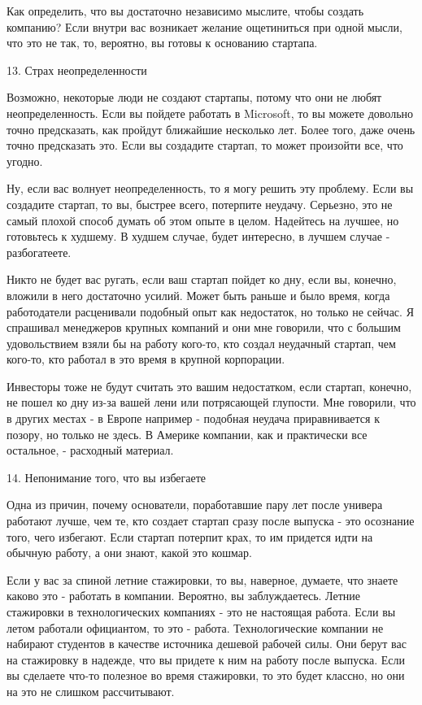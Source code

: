 \documentclass[ebook,12pt,oneside,openany]{memoir}
\begin{document}
Как определить, что вы достаточно независимо мыслите, чтобы создать
компанию? Если внутри вас возникает желание ощетиниться при одной
мысли, что это не так, то, вероятно, вы готовы к основанию стартапа.

13. Страх неопределенности

Возможно, некоторые люди не создают стартапы, потому что они не любят
неопределенность. Если вы пойдете работать в Microsoft, то вы можете
довольно точно предсказать, как пройдут ближайшие несколько лет. Более
того, даже очень точно предсказать это. Если вы создадите стартап, то
может произойти все, что угодно.

Ну, если вас волнует неопределенность, то я могу решить эту проблему.
Если вы создадите стартап, то вы, быстрее всего, потерпите неудачу.
Серьезно, это не самый плохой способ думать об этом опыте в целом.
Надейтесь на лучшее, но готовьтесь к худшему. В худшем случае, будет
интересно, в лучшем случае - разбогатеете.

Никто не будет вас ругать, если ваш стартап пойдет ко дну, если вы,
конечно, вложили в него достаточно усилий. Может быть раньше и было
время, когда работодатели расценивали подобный опыт как недостаток, но
только не сейчас. Я спрашивал менеджеров крупных компаний и они мне
говорили, что с большим удовольствием взяли бы на работу кого-то, кто
создал неудачный стартап, чем кого-то, кто работал в это время в
крупной корпорации.

Инвесторы тоже не будут считать это вашим недостатком, если стартап,
конечно, не пошел ко дну из-за вашей лени или потрясающей глупости.
Мне говорили, что в других местах - в Европе например - подобная
неудача приравнивается к позору, но только не здесь. В Америке
компании, как и практически все остальное, - расходный материал.

14. Непонимание того, что вы избегаете

Одна из причин, почему основатели, поработавшие пару лет после универа
работают лучше, чем те, кто создает стартап сразу после выпуска - это
осознание того, чего избегают. Если стартап потерпит крах, то им
придется идти на обычную работу, а они знают, какой это кошмар.

Если у вас за спиной летние стажировки, то вы, наверное, думаете, что
знаете каково это - работать в компании. Вероятно, вы заблуждаетесь.
Летние стажировки в технологических компаниях - это не настоящая
работа. Если вы летом работали официантом, то это - работа.
Технологические компании не набирают студентов в качестве источника
дешевой рабочей силы. Они берут вас на стажировку в надежде, что вы
придете к ним на работу после выпуска. Если вы сделаете что-то
полезное во время стажировки, то это будет классно, но они на это не
слишком рассчитывают.
\end{document}
